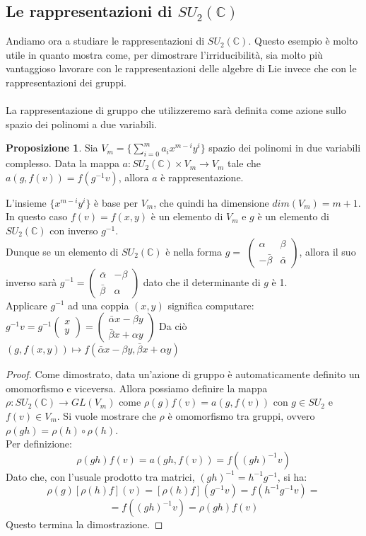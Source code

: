 \documentclass[12pt,a4paper]{report}
\theoremstyle{definition}
\theoremstyle{Theorem}
\newtheorem{Prop}[Def]{Proposizione}
\theoremstyle{definition}
\theoremstyle{definition}
\theoremstyle{definition}
\begin{document}
\subsection{Le rappresentazioni di $SU_2(\mathbb{C})$}
Andiamo ora a studiare le rappresentazioni di $SU_2(\mathbb{C})$. Questo esempio è molto utile in quanto mostra come, per dimostrare l'irriducibilità, sia molto più vantaggioso lavorare con le rappresentazioni delle algebre di Lie invece che con le rappresentazioni dei gruppi.\\
\\
La rappresentazione di gruppo che utilizzeremo sarà definita come azione sullo spazio dei polinomi a due variabili.
\begin{Prop}
	Sia $V_m=\{\sum_{i=0}^{m} a_ix^{m-i}y^i\}$ spazio dei polinomi in due variabili complesso. Data la mappa $a:SU_2(\mathbb{C})\times V_m\rightarrow V_m$ tale che $a(g,f(v))=f(g^{-1}v)$, allora $a$ è rappresentazione.
\end{Prop}
L'insieme $\{x^{m-i}y^i\}$ è base per $V_m$, che quindi ha dimensione $dim(V_m)=m+1$.\\
In questo caso $f(v)=f(x,y)$ è un elemento di $V_m$ e $g$ è un elemento di $SU_2(\mathbb{C})$ con inverso $g^{-1}$.\\
Dunque se un elemento di $SU_2(\mathbb{C})$ è nella forma $g=$
$\begin{pmatrix}
	\alpha&\beta\\
	-\bar{\beta}&\bar{\alpha}
\end{pmatrix}$,
allora il suo inverso sarà $g^{-1}=
\begin{pmatrix}
	\bar{\alpha}&-\beta\\
	\bar{\beta}&\alpha
\end{pmatrix}$ dato che il determinante di $g$ è 1. \\
Applicare $g^{-1}$ ad una coppia $(x,y)$ significa computare:
$g^{-1}v=g^{-1}
\begin{pmatrix}
	x\\y
\end{pmatrix}=
\begin{pmatrix}
	\bar{\alpha}x-\beta y\\
	\bar{\beta}x+\alpha y
\end{pmatrix}$
Da ciò $(g,f(x,y))\longmapsto f(\bar{\alpha}x-\beta y,\bar{\beta}x+\alpha y)$
\begin{proof}
	Come dimostrato, data un'azione di gruppo è automaticamente definito un omomorfismo e viceversa. Allora possiamo definire la mappa $\rho:SU_2(\mathbb{C})\rightarrow GL(V_m)$ come $\rho(g)f(v)=a(g,f(v))$ con $g\in SU_2$ e $f(v)\in V_m$.
	Si vuole mostrare che $\rho$ è omomorfismo tra gruppi, ovvero $\rho(gh)=\rho(h)\circ\rho(h)$.\\
	Per definizione:
	$$\rho(gh)f(v)=a(gh,f(v))=f((gh)^{-1}v)$$
	Dato che, con l'usuale prodotto tra matrici, $(gh)^{-1}=h^{-1}g^{-1}$, si ha:
	$$\rho(g)[\rho(h)f](v)=[\rho(h)f](g^{-1}v)=f(h^{-1}g^{-1}v)=$$
	$$=f((gh)^{-1}v)=\rho(gh)f(v)$$
	Questo termina la dimostrazione.
\end{proof}
\end{document}
